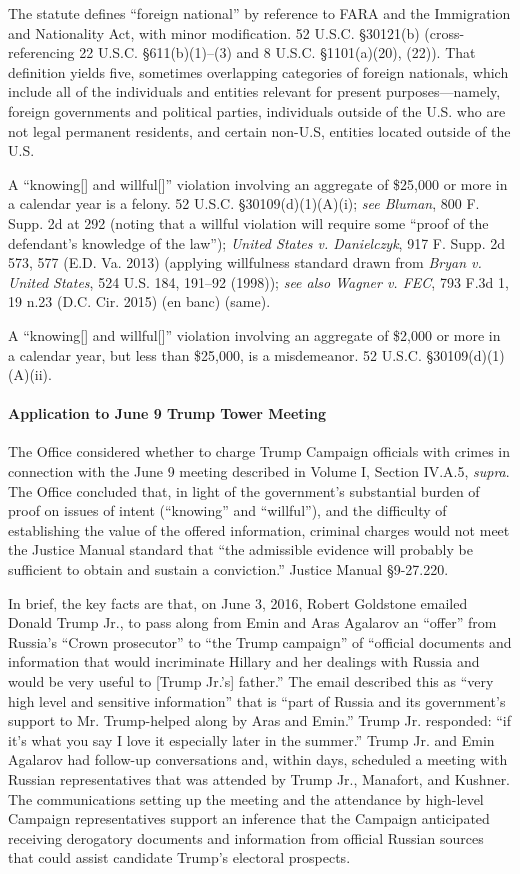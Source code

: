 The statute defines ``foreign national'' by reference to FARA and the Immigration and Nationality Act, with minor modification.
52 U.S.C. \S 30121(b) (cross-referencing 22 U.S.C. \S 611(b)(1)--(3) and 8 U.S.C. \S 1101(a)(20), (22)).
That definition yields five, sometimes overlapping categories of foreign nationals, which include all of the individuals and entities relevant for present purposes---namely, foreign governments and political parties, individuals outside of the U.S. who are not legal permanent residents, and certain non-U.S, entities located outside of the U.S.

A ``knowing[] and willful[]'' violation involving an aggregate of \$25,000 or more in a calendar year is a felony.
52 U.S.C. \S 30109(d)(1)(A)(i); \textit{see Bluman}, 800 F. Supp. 2d at 292 (noting that a willful violation will require some ``proof of the defendant's knowledge of the law''); \textit{United States v. Danielczyk}, 917 F. Supp. 2d 573, 577 (E.D. Va. 2013) (applying willfulness standard drawn from \textit{Bryan v. United States}, 524 U.S. 184, 191--92 (1998)); \textit{see also Wagner v. FEC}, 793 F.3d 1, 19 n.23 (D.C. Cir. 2015) (en banc) (same).

A ``knowing[] and willful[]'' violation involving an aggregate of \$2,000 or more in a calendar year, but less than \$25,000, is a misdemeanor.
52 U.S.C. \S 30109(d)(1)(A)(ii).

\paragraph{Application to June 9 Trump Tower Meeting}
The Office considered whether to charge Trump Campaign officials with crimes in connection with the June 9 meeting described in Volume I, Section IV.A.5, \textit{supra}.
The Office concluded that, in light of the government's substantial burden of proof on issues of intent (``knowing'' and ``willful''), and the difficulty of establishing the value of the offered information, criminal charges would not meet the Justice Manual standard that ``the admissible evidence will probably be sufficient to obtain and sustain a conviction.''
Justice Manual \S 9-27.220.

In brief, the key facts are that, on June 3, 2016, Robert Goldstone emailed Donald Trump Jr., to pass along from Emin and Aras Agalarov an ``offer'' from Russia's ``Crown prosecutor'' to ``the Trump campaign'' of ``official documents and information that would incriminate Hillary and her dealings with Russia and would be very useful to [Trump Jr.'s] father.''
The email described this as ``very high level and sensitive information'' that is ``part of Russia and its government's support to Mr. Trump-helped along by Aras and Emin.''
Trump Jr. responded: ``if it's what you say I love it especially later in the summer.''
Trump Jr. and Emin Agalarov had follow-up conversations and, within days, scheduled a meeting with Russian representatives that was attended by Trump Jr., Manafort, and Kushner.
The communications setting up the meeting and the attendance by high-level Campaign representatives support an inference that the Campaign anticipated receiving derogatory documents and information from official Russian sources that could assist candidate Trump's electoral prospects.

